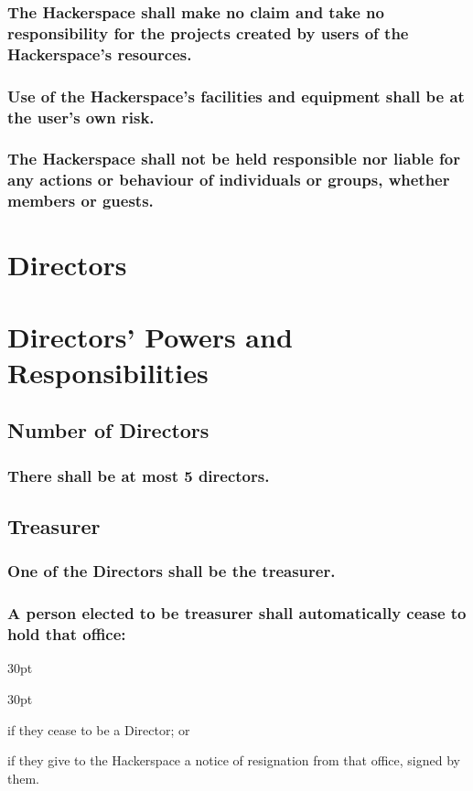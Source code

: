 \documentclass[12pt]{article}
\def\clauseindent{30pt}
\newenvironment{subindentlist}{\begin{adjustwidth}{\clauseindent}{}\begin{labeledlist}{\clauseindent}}{\end{labeledlist}\end{adjustwidth}}
\begin{document}
\subsubsection[The Hackerspace is not responsible]{The Hackerspace shall make no claim and take no responsibility for the projects created by users of the Hackerspace's resources.}
\subsubsection[Use of the resources is at user's own risk]{Use of the Hackerspace's facilities and equipment shall be at the user's own risk.}
\subsubsection[The Hackerspace is not liable]{The Hackerspace shall not be held responsible nor liable for any actions or behaviour of individuals or groups, whether members or guests.}

\section*{Directors}
\section*{Directors' Powers and Responsibilities}

\subsection{Number of Directors}
\subsubsection[Limit to number of Directors]{There shall be at most 5 directors.}\label{subsubsection:numdirectors}

\subsection{Treasurer}
\subsubsection{One of the Directors shall be the treasurer.}
\subsubsection[Automatic termination of Treasurer]{A person elected to be treasurer shall automatically cease to hold that office:}
\begin{subindentlist}
  \item if they cease to be a Director; or
  \item if they give to the Hackerspace a notice of resignation from that office, signed by them.
\end{subindentlist}
\end{document}
